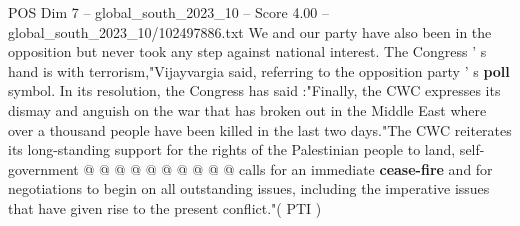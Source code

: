 \begin{textsample}{POS Dim 7 – global\_south\_2023\_10 – Score 4.00 – global\_south\_2023\_10/102497886.txt}
We and our party have also been in the opposition but never took any step against national interest.
The Congress ' s hand is with terrorism,"Vijayvargia said, referring to the opposition party ' s \textbf{poll} symbol.
In its resolution, the Congress has said :"Finally, the CWC expresses its dismay and anguish on the war that has broken out in the Middle East where over a thousand people have been killed in the last two days."The CWC reiterates its long-standing support for the rights of the Palestinian people to land, self-government @ @ @ @ @ @ @ @ @ @ calls for an immediate \textbf{cease-fire} and for negotiations to begin on all outstanding issues, including the imperative issues that have given rise to the present conflict."( PTI )

\end{textsample}
